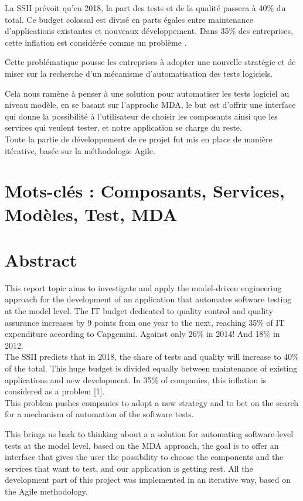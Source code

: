 \documentclass[
10pt, %
a4paper, %
oneside, %
headinclude,footinclude, %
BCOR5mm, %
]{report}
\begin{document}
	La SSII prévoit qu’en 2018, la part des tests et de la qualité passera à 40\% du total. Ce budget colossal est divisé en parts égales entre maintenance d’applications existantes et nouveaux développement. Dans 35\% des entreprises, cette inflation est considérée comme un problème \citep{silicon}.
														
	Cette problématique pousse les entreprises à adopter une nouvelle stratégie et de miser sur la recherche d’un mécanisme d’automatisation des tests logiciels.
														
	Cela nous ramène à penser à une solution pour automatiser les tests logiciel au niveau modèle, en se basant sur l’approche MDA, le but est d’offrir une interface qui donne la possibilité à l’utilisateur de choisir les composants ainsi que les services qui veulent tester, et notre application se charge du reste.\\
														
	Toute la partie de développement de ce projet fut mis en place de manière itérative, basée sur la méthodologie Agile.
	\section*{Mots-clés : Composants, Services, Modèles, Test, MDA}
														
	\newpage
	\section*{Abstract} 
	This report topic aims to investigate and apply the model-driven engineering approach for the development of an application that automates software testing at the model level. The IT budget dedicated to quality control and quality assurance increases by 9 points from one year to the next, reaching 35\% of IT expenditure according to Capgemini. Against only 26\% in 2014! And 18\% in 2012. \\
	
	The SSII predicts that in 2018, the share of tests and quality will increase to 40\% of the total. This huge budget is divided equally between maintenance of existing applications and new development. In 35\% of companies, this inflation is considered as a problem [1]. \\

	This problem pushes companies to adopt a new strategy and to bet on the search for a mechanism of automation of the software tests.

	
	This brings us back to thinking about a a solution for automating software-level tests at the model level, based on the MDA approach, the goal is to offer an interface that gives the user the possibility to choose the components and the services that want to test, and our application is getting rest. All the development part of this project was implemented in an iterative way, based on the Agile methodology.
								  
\end{document}
